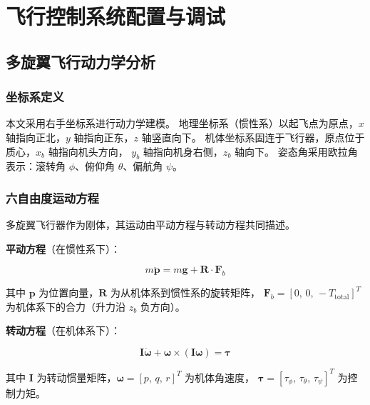 
\chapter{飞行控制系统配置与调试}

\section{多旋翼飞行动力学分析}

\subsection{坐标系定义}

本文采用右手坐标系进行动力学建模。
地理坐标系（惯性系）以起飞点为原点，$x$ 轴指向正北，$y$ 轴指向正东，$z$ 轴竖直向下。
机体坐标系固连于飞行器，原点位于质心，$x_b$ 轴指向机头方向，
$y_b$ 轴指向机身右侧，$z_b$ 轴向下。
姿态角采用欧拉角表示：滚转角 $\phi$、俯仰角 $\theta$、偏航角 $\psi$。

\subsection{六自由度运动方程}

多旋翼飞行器作为刚体，其运动由平动方程与转动方程共同描述。

\textbf{平动方程}（在惯性系下）：

\begin{equation}
    m\ddot{\boldsymbol{p}} = m\boldsymbol{g} + \boldsymbol{R} \cdot \boldsymbol{F}_b
    \label{eq:translation}
\end{equation}

其中 $\boldsymbol{p}$ 为位置向量，$\boldsymbol{R}$ 为从机体系到惯性系的旋转矩阵，
$\boldsymbol{F}_b = [0,\,0,\,-T_{\text{total}}]^T$ 为机体系下的合力（升力沿 $z_b$ 负方向）。

\textbf{转动方程}（在机体系下）：

\begin{equation}
    \boldsymbol{I}\dot{\boldsymbol{\omega}} + \boldsymbol{\omega} \times (\boldsymbol{I}\boldsymbol{\omega}) = \boldsymbol{\tau}
    \label{eq:rotation}
\end{equation}

其中 $\boldsymbol{I}$ 为转动惯量矩阵，$\boldsymbol{\omega} = [p,\,q,\,r]^T$ 为机体角速度，
$\boldsymbol{\tau} = [\tau_\phi,\,\tau_\theta,\,\tau_\psi]^T$ 为控制力矩。

